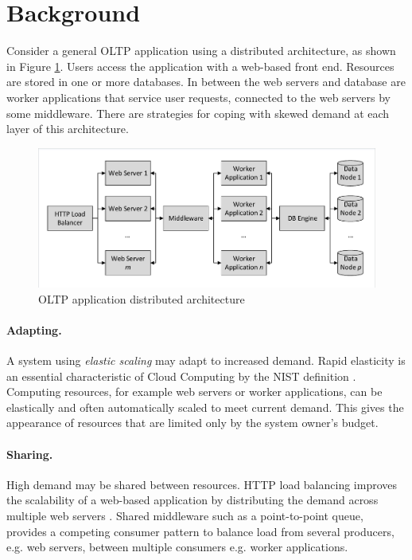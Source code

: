 \documentclass[runningheads]{llncs}
\begin{document}
%
%

\section{Background}\label{sec:background}

Consider a general OLTP application using a distributed architecture, as shown in Figure \ref{figure:oltpapplication}.  Users access the application with a web-based front end.  Resources are stored in one or more databases.  In between the web servers and database are worker applications that service user requests, connected to the web servers by some middleware.  There are strategies for coping with skewed demand at each layer of this architecture.

\begin{figure}
	\centering
	\includegraphics[trim = 5 5 5 5, clip, width=\textwidth]{img/application}
	\caption{OLTP application distributed architecture}
	\label{figure:oltpapplication}
\end{figure}

\paragraph{Adapting.} A system using {\itshape elastic scaling} may adapt to increased demand. Rapid elasticity is an essential characteristic of Cloud Computing by the NIST definition \cite{RN56}.  Computing resources, for example web servers or worker applications, can be elastically and often automatically scaled to meet current demand.  This gives the appearance of resources that are limited only by the system owner's budget.

\paragraph{Sharing.} High demand may be shared between resources.  HTTP load balancing improves the scalability of a web-based application by distributing the demand across multiple web servers \cite{RN73}.  Shared middleware such as a point-to-point queue, provides a competing consumer pattern to balance load from several producers, e.g. web servers, between multiple consumers e.g. worker applications.
\end{document}
